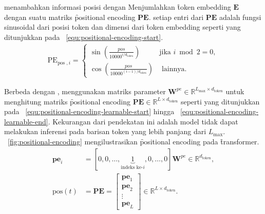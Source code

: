 	\cite{transformerori} menambahkan informasi posisi dengan Menjumlahkan \f{token embedding} $\mathbf{E}$ dengan suatu matriks \f{positional encoding} $\mathbf{PE}$. setiap entri dari $\mathbf{PE}$ adalah fungsi sinusoidal dari posisi token  dan dimensi dari \f{token embedding} seperti yang ditunjukkan pada \equ~\ref{equ:positional-encoding-start}.
	\begin{align}
		\label{equ:positional-encoding-start}
		\text{PE}_{ \text {pos }, i}= \begin{cases}\sin \left(\frac{p o s}{10000^{i / d_{\text {token}}}}\right) & \text {jika } i \bmod 2=0 ,\\ \cos \left(\frac{p o s}{10000^{(i-1) / d_{\text {token}}}}\right) & \text { lainnya. }\end{cases}
	\end{align}

	Berbeda dengan \cite{transformerori}, \cite{bertori} menggunakan matriks parameter $\mathbf{W}^{pe} \in \mathbb{R}^{L_{\max} \times d_{\text{token}}}$ untuk menghitung matriks \f{positional encoding} $\mathbf{PE} \in \mathbb{R}^{L \times d_{\text{token}}}$ seperti yang ditunjukkan pada \equ~\ref{equ:positional-encoding-learnable-start} hingga \equ~\ref{equ:positional-encoding-learnable-end}. Kekurangan dari pendekatan ini adalah model tidak dapat melakukan inferensi pada barisan token yang lebih panjang dari $L_{\max}$. \pic~\ref{fig:positional-encoding} mengilustrasikan \f{positional encoding} pada \f{transformer}.
	\begin{align}
		\label{equ:positional-encoding-learnable-start}
		\mathbf{pe}_{i} &= [0, 0,\dots, \underbrace{1}_{\text{indeks ke-}i},0, \dots, 0] \mathbf{W}^{pe} \in \mathbb{R}^{d_{\text{token}}}, \\
		\label{equ:positional-encoding-learnable-end}
		 \text{pos}(t) &= \mathbf{PE} = \begin{bmatrix}
			\mathbf{pe}_1 \\
			\mathbf{pe}_2 \\
			\vdots \\
			\mathbf{pe}_L
		\end{bmatrix} \in \mathbb{R}^{L \times d_{\text{token}}}.
	\end{align}


